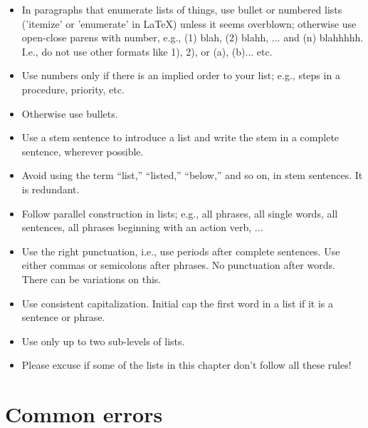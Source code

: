 \begin{itemize}
\item In paragraphs that enumerate lists of things, use bullet or numbered lists ('itemize' or 'enumerate' in LaTeX) unless it seems overblown; otherwise use open-close parens with number, e.g., (1) blah, (2) blahh, ... and (n) blahhhhh. I.e., do not use other formats like 1), 2), or (a), (b)... etc.
\item Use numbers only if there is an implied order to your list; e.g., steps in a procedure, priority, etc.
\item Otherwise use bullets.
\item Use a stem sentence to introduce a list and write the stem in a complete sentence, wherever possible.
\item Avoid using the term ``list,'' ``listed,'' ``below,'' and so on, in stem sentences. It is redundant. 
\item Follow parallel construction in lists; e.g., all phrases, all single words, all sentences, all phrases beginning with an action verb, ...
\item Use the right punctuation, i.e., use periods after complete sentences. Use either commas or semicolons after phrases. No punctuation after words. There can be variations on this.
\item Use consistent capitalization. Initial cap the first word in a list if it is a sentence or phrase. 
\item Use only up to two sub-levels of lists.
\item Please excuse if some of the lists in this chapter don't follow all these rules!
\end{itemize}

\section{Common errors}
\label{sec:errors}

